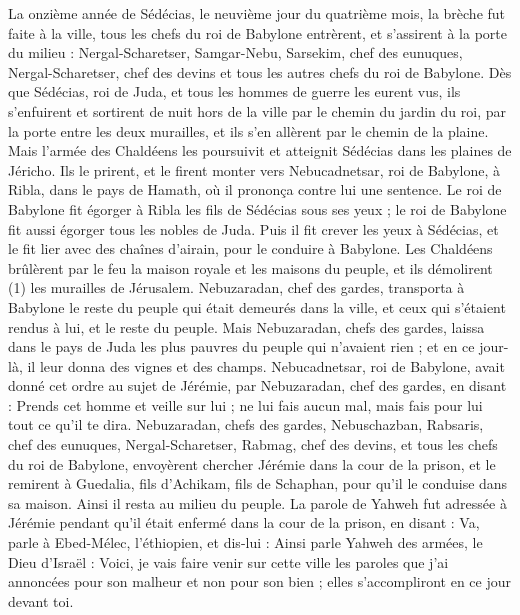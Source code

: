 \begin{multicols}{2}
La onzième année de Sédécias, le neuvième jour du quatrième mois, la brèche fut faite à la ville,
tous les chefs du roi de Babylone entrèrent, et s'assirent à la porte du milieu : Nergal-Scharetser, Samgar-Nebu, Sarsekim, chef des eunuques, Nergal-Scharetser, chef des devins et tous les autres chefs du roi de Babylone.
Dès que Sédécias, roi de Juda, et tous les hommes de guerre les eurent vus, ils s'enfuirent et sortirent de nuit hors de la ville par le chemin du jardin du roi, par la porte entre les deux murailles, et ils s'en allèrent par le chemin de la plaine.
Mais l'armée des Chaldéens les poursuivit et atteignit Sédécias dans les plaines de Jéricho. Ils le prirent, et le firent monter vers Nebucadnetsar, roi de Babylone, à Ribla, dans le pays de Hamath, où il prononça contre lui une sentence.
Le roi de Babylone fit égorger à Ribla les fils de Sédécias sous ses yeux ; le roi de Babylone fit aussi égorger tous les nobles de Juda.
Puis il fit crever les yeux à Sédécias, et le fit lier avec des chaînes d'airain, pour le conduire à Babylone.
Les Chaldéens brûlèrent par le feu la maison royale et les maisons du peuple, et ils démolirent\FTNT{} (1) les murailles de Jérusalem.
Nebuzaradan, chef des gardes, transporta à Babylone le reste du peuple qui était demeurés dans la ville, et ceux qui s'étaient rendus à lui, et le reste du peuple.
Mais Nebuzaradan, chefs des gardes, laissa dans le pays de Juda les plus pauvres du peuple qui n’avaient rien ; et en ce jour-là, il leur donna des vignes et des champs.
Nebucadnetsar, roi de Babylone, avait donné cet ordre au sujet de Jérémie, par Nebuzaradan, chef des gardes, en disant :
Prends cet homme et veille sur lui ;  ne lui fais aucun mal, mais fais pour lui tout ce qu'il te dira.
Nebuzaradan, chefs des gardes, Nebuschazban, Rabsaris, chef des eunuques, Nergal-Scharetser, Rabmag,  chef des devins, et tous les chefs du roi de Babylone,
envoyèrent chercher Jérémie dans la cour de la prison, et le remirent à Guedalia, fils d'Achikam, fils de Schaphan, pour qu’il le conduise dans sa maison. Ainsi il resta au milieu du peuple.
La parole de Yahweh fut adressée à Jérémie pendant qu'il était enfermé dans la cour de la prison, en disant :
Va,  parle à Ebed-Mélec, l’éthiopien, et dis-lui : Ainsi parle Yahweh des armées, le Dieu d'Israël : Voici, je vais faire venir sur cette ville les paroles que j’ai annoncées pour son malheur et non pour son bien ; elles s’accompliront en ce jour devant toi.

\end{multicols}
